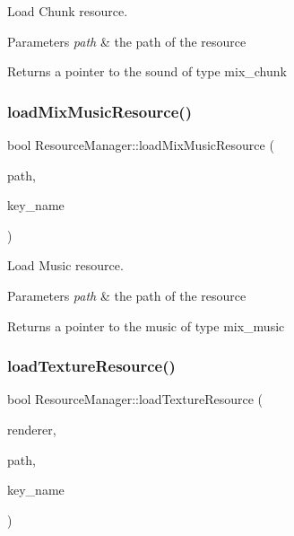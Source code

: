 Load Chunk resource. 


\begin{DoxyParams}{Parameters}
{\em path} & the path of the resource \\
\hline
\end{DoxyParams}
\begin{DoxyReturn}{Returns}
a pointer to the sound of type mix\+\_\+chunk 
\end{DoxyReturn}
\mbox{\label{class_resource_manager_a125deb8dec47d699ac7bf56c733f8b8b}} 
\subsubsection{\texorpdfstring{load\+Mix\+Music\+Resource()}{loadMixMusicResource()}}
{\footnotesize\ttfamily bool Resource\+Manager\+::load\+Mix\+Music\+Resource (\begin{DoxyParamCaption}\item[{const char $\ast$}]{path,  }\item[{std\+::string}]{key\+\_\+name }\end{DoxyParamCaption})}



Load Music resource. 


\begin{DoxyParams}{Parameters}
{\em path} & the path of the resource \\
\hline
\end{DoxyParams}
\begin{DoxyReturn}{Returns}
a pointer to the music of type mix\+\_\+music 
\end{DoxyReturn}
\mbox{\label{class_resource_manager_a4e3fc5baab534cea8f334d8eaafb3a3d}} 
\subsubsection{\texorpdfstring{load\+Texture\+Resource()}{loadTextureResource()}}
{\footnotesize\ttfamily bool Resource\+Manager\+::load\+Texture\+Resource (\begin{DoxyParamCaption}\item[{S\+D\+L\+\_\+\+Renderer $\ast$}]{renderer,  }\item[{const char $\ast$}]{path,  }\item[{std\+::string}]{key\+\_\+name }\end{DoxyParamCaption})}

